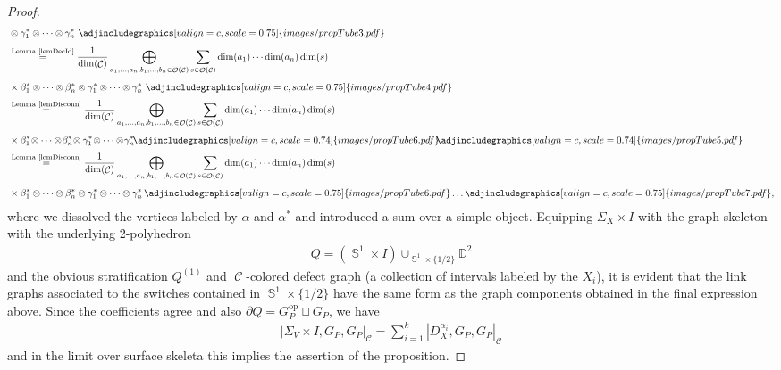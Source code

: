 \documentclass[10pt,a4paper]{amsart}
\DeclareMathOperator{\Sp}{\mathbb{S}}
\DeclareMathOperator{\calc}{\mathcal{C}}
\DeclareMathOperator{\calo}{\mathcal{O}}
\numberwithin{equation}{section}
\theoremstyle{definition}
\begin{document}
\begin{proof}
\begin{align*}
 & \otimes \gamma_1^* \otimes \dots \otimes \gamma_n^* \, \,\adjincludegraphics[valign=c, scale = 0.75]{images/propTube3.pdf} \\[1.5mm]
 &\overset{\text{Lemma~\ref{lemDecId}}}{=} \frac{1}{\dim(\calc)} \bigoplus_{a_1, \dots, a_n, b_1, \dots, b_n \in \calo(\calc)} \sum_{s \in \calo(\calc)} \dim(a_1) \cdots \dim(a_n) \dim(s) \\[1.5mm]
 & \times \beta_1^* \otimes \dots \otimes \beta_n^* \otimes \gamma_1^* \otimes \dots \otimes \gamma_n^* \, \,\adjincludegraphics[valign=c, scale = 0.75]{images/propTube4.pdf} \\[1mm]
 &\overset{\text{Lemma~\ref{lemDisconn}}}{=} \frac{1}{\dim(\calc)} \bigoplus_{a_1, \dots, a_n, b_1, \dots, b_n \in \calo(\calc)} \sum_{s \in \calo(\calc)} \dim(a_1) \cdots \dim(a_n) \dim(s) \\[1.5mm]
 & \times \beta_1^*\! \otimes \dots \otimes\! \beta_n^*\! \otimes \gamma_1^*\! \otimes \dots \otimes\! \gamma_n^* \! \adjincludegraphics[valign=c, scale = 0.74]{images/propTube6.pdf}\!\! \adjincludegraphics[valign=c, scale = 0.74]{images/propTube5.pdf} \\[1mm]
 &\overset{\text{Lemma~\ref{lemDisconn}}}{=} \frac{1}{\dim(\calc)} \bigoplus_{a_1, \dots, a_n, b_1, \dots, b_n \in \calo(\calc)} \sum_{s \in \calo(\calc)} \dim(a_1) \cdots \dim(a_n) \dim(s) \\[1.5mm]
 & \times \beta_1^* \otimes \dots \otimes \beta_n^* \otimes \gamma_1^* \otimes \dots \otimes \gamma_n^* \,\adjincludegraphics[valign=c, scale = 0.75]{images/propTube6.pdf} \dots \adjincludegraphics[valign=c, scale = 0.75]{images/propTube7.pdf},
 \end{align*}
 where we dissolved the vertices labeled by $\alpha$ and $\alpha^*$ and introduced a sum over a simple object. Equipping $\Sigma_X \times I$ with the graph skeleton with the underlying 2-polyhedron
 \begin{align*}
 Q = \left(\Sp^1 \times I\right) \cup_{ \Sp^1 \times \{1/2\}} \mathbb{D}^2
 \end{align*}
 and the obvious stratification $Q^{(1)}$ and $\calc$-colored defect graph (a collection of intervals labeled by the $X_i$), it is evident that the link graphs associated to the switches contained in $\Sp^1 \times \{1/2\}$ have the same form as the graph components obtained in the final expression above. Since the coefficients agree and also $\partial Q = G_P^{\mathrm{op}} \sqcup G_P$, we have
 \begin{align*}
 |\Sigma_V \times I, G_{P}, G_P|_{\calc} = \sum_{i = 1}^k|D_X^{\alpha_i}, G_P, G_P|_{\calc}
 \end{align*}
 and in the limit over surface skeleta this implies the assertion of the proposition.
\end{proof}
\end{document}
